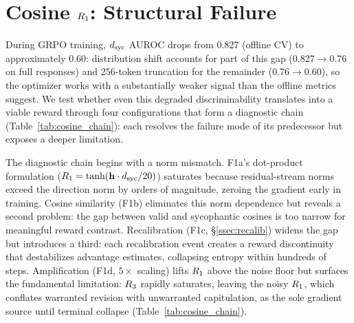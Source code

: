 \section{Cosine \texorpdfstring{$\rone$}{R1}: Structural Failure}
\label{sec:cosine_failure}

During GRPO training, $d_{\text{syc}}$ AUROC drops from 0.827 (offline CV) to approximately 0.60: distribution shift accounts for part of this gap (0.827$\to$0.76 on full responses) and 256-token truncation for the remainder (0.76$\to$0.60), so the optimizer works with a substantially weaker signal than the offline metrics suggest.
We test whether even this degraded discriminability translates into a viable reward through four configurations that form a diagnostic chain (Table~\ref{tab:cosine_chain}): each resolves the failure mode of its predecessor but exposes a deeper limitation.

\begin{table}[t]
\centering
\caption{Cosine $\rone$ failure chain on Qwen3-8B (LoRA rank$=$64, GRPO with $R = w_1 \cdot \rone + w_3 \cdot \rthree$).}
\label{tab:cosine_chain}
\end{table}

The diagnostic chain begins with a norm mismatch.
F1a's dot-product formulation ($R_1 = \tanh(\mathbf{h} \cdot d_{\text{syc}} / 20)$) saturates because residual-stream norms exceed the direction norm by orders of magnitude, zeroing the gradient early in training.
Cosine similarity (F1b) eliminates this norm dependence but reveals a second problem: the gap between valid and sycophantic cosines is too narrow for meaningful reward contrast.
Recalibration (F1c, \S\ref{ssec:recalib}) widens the gap but introduces a third: each recalibration event creates a reward discontinuity that destabilizes advantage estimates, collapsing entropy within hundreds of steps.
Amplification (F1d, $5{\times}$ scaling) lifts $\rone$ above the noise floor but surfaces the fundamental limitation: $R_3$ rapidly saturates, leaving the noisy $\rone$, which conflates warranted revision with unwarranted capitulation, as the sole gradient source until terminal collapse (Table~\ref{tab:cosine_chain}).


